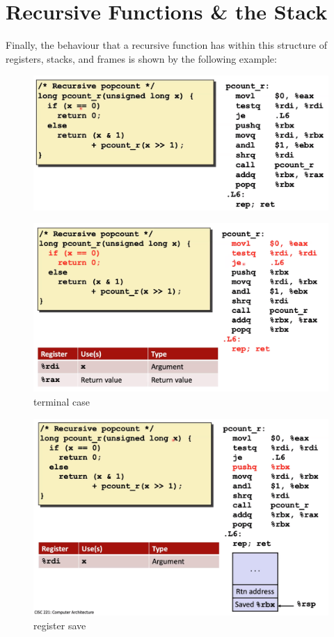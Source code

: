 \documentclass[12pt]{book}
\begin{document}
\pagebreak

\section*{Recursive Functions \& the Stack}
Finally, the behaviour that a recursive function has within this structure of registers, stacks, and frames is
shown by the following example:
\begin{figure}[h]
        \centering
        \includegraphics[scale = 0.2]{./figures/rec1}
\end{figure}

\begin{figure}
        \centering
        \includegraphics[scale = 0.2]{./figures/rec2}
        \caption{terminal case}
\end{figure}

\begin{figure}
        \centering
        \includegraphics[scale = 0.2]{./figures/rec3}
        \caption{register save}
\end{figure}
\end{document}
